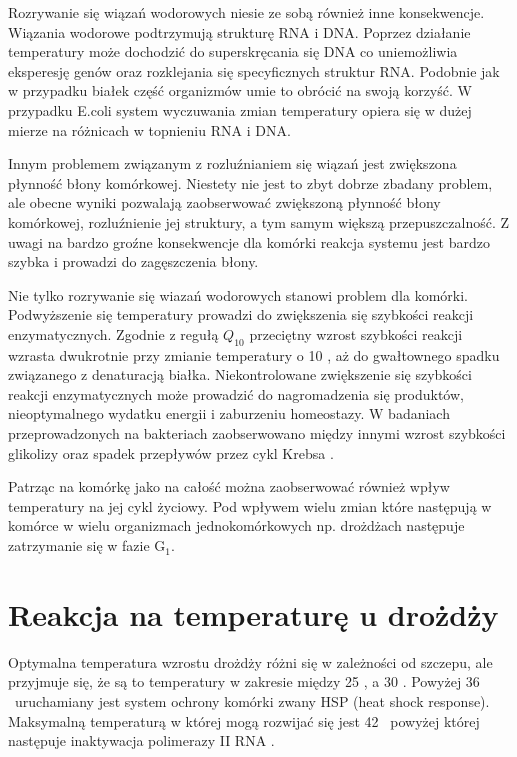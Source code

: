 \documentclass{pracamgr}
\begin{document}
Rozrywanie się wiązań wodorowych niesie ze sobą również inne konsekwencje. Wiązania wodorowe podtrzymują strukturę RNA i DNA. Poprzez działanie temperatury może dochodzić do superskręcania się DNA co uniemożliwia 
eksperesję genów oraz rozklejania się specyficznych struktur RNA. Podobnie jak w przypadku białek część organizmów umie to obrócić na swoją korzyść. W przypadku E.coli system wyczuwania zmian temperatury opiera się
w dużej mierze na różnicach w topnieniu RNA i DNA\cite{TsInEubact, Digel08}.

Innym problemem związanym z rozluźnianiem się wiązań jest zwiększona płynność błony komórkowej. Niestety nie jest to zbyt dobrze zbadany problem\cite{Membranefluidity}, ale obecne wyniki pozwalają zaobserwować zwiększoną
płynność błony komórkowej, rozluźnienie jej struktury, a tym samym większą przepuszczalność. Z uwagi na bardzo groźne konsekwencje dla komórki reakcja systemu jest bardzo szybka i prowadzi do zagęszczenia błony.

Nie tylko rozrywanie się wiazań wodorowych stanowi problem dla komórki. Podwyższenie się temperatury prowadzi do zwiększenia się szybkości reakcji enzymatycznych. Zgodnie z regułą $Q_{10}$ przeciętny wzrost
szybkości reakcji wzrasta dwukrotnie przy zmianie temperatury o 10 \textcelsius, aż do gwałtownego spadku związanego z denaturacją białka\cite{}. Niekontrolowane zwiększenie się szybkości reakcji enzymatycznych
może prowadzić do nagromadzenia się produktów, nieoptymalnego wydatku energii i zaburzeniu homeostazy. W badaniach przeprowadzonych na bakteriach zaobserwowano między innymi wzrost szybkości glikolizy oraz spadek przepływów przez 
cykl Krebsa \cite{Wittmann07}.

Patrząc na komórkę jako na całość można zaobserwować również wpływ temperatury na jej cykl życiowy. Pod wpływem wielu zmian które następują w komórce w wielu organizmach jednokomórkowych np. drożdżach 
następuje zatrzymanie się w fazie G$_1$.

\section{Reakcja na temperaturę u drożdży}

Optymalna temperatura wzrostu drożdży różni się w zależności od szczepu, ale przyjmuje się, że są to temperatury w 
zakresie między 25 \textcelsius, a 30 \textcelsius. Powyżej 36 \textcelsius\ uruchamiany jest system ochrony komórki
zwany HSP (heat shock response). Maksymalną temperaturą  w której mogą rozwijać się jest 42 \textcelsius\ powyżej której 
następuje inaktywacja polimerazy II RNA \cite{Morano12}.
\end{document}
